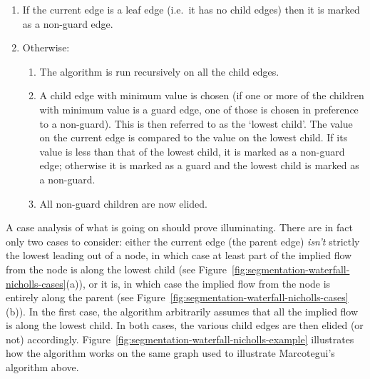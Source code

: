 \begin{enumerate}

\item If the current edge is a leaf edge (i.e.~it has no child edges) then it is marked as a non-guard edge.

\item Otherwise:

\begin{enumerate}

\item The algorithm is run recursively on all the child edges.

\item A child edge with minimum value is chosen (if one or more of the children with minimum value is a guard edge, one of those is chosen in preference to a non-guard). This is then referred to as the `lowest child'. The value on the current edge is compared to the value on the lowest child. If its value is less than that of the lowest child, it is marked as a non-guard edge; otherwise it is marked as a guard and the lowest child is marked as a non-guard.

\item All non-guard children are now elided.

\end{enumerate}

\end{enumerate}

\noindent A case analysis of what is going on should prove illuminating. There are in fact only two cases to consider: either the current edge (the parent edge) \emph{isn't} strictly the lowest leading out of a node, in which case at least part of the implied flow from the node is along the lowest child (see Figure~\ref{fig:segmentation-waterfall-nicholls-cases}(a)), or it is, in which case the implied flow from the node is entirely along the parent (see Figure~\ref{fig:segmentation-waterfall-nicholls-cases}(b)). In the first case, the algorithm arbitrarily assumes that all the implied flow is along the lowest child. In both cases, the various child edges are then elided (or not) accordingly. Figure~\ref{fig:segmentation-waterfall-nicholls-example} illustrates how the algorithm works on the same graph used to illustrate Marcotegui's algorithm above.

